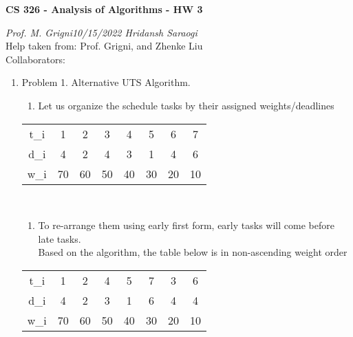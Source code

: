 \documentclass[11pt]{article}
\begin{document}
\begin{center}
    \textbf{CS 326 - Analysis of Algorithms - HW 3}\\
\end{center}


\begin{flushleft}
    \textit{Prof. M. Grigni\hfill10/15/2022 \hfill Hridansh Saraogi} \\
    \vspace{0.15cm}
    \small {Help taken from: Prof. Grigni, and Zhenke Liu}\\
    \small {Collaborators: }
\end{flushleft}


\begin{enumerate}

\item Problem 1. Alternative UTS Algorithm. 
    \begin{enumerate}
        \item Let us organize the schedule tasks by their assigned weights/deadlines
    \end{enumerate}
\begin{center}
    \begin{tabular}{ |c|c|c|c|c|c|c|c| } 
    \hline
    t_i & 1 & 2 & 3 & 4 & 5 & 6 & 7 \\ 
    d_i & 4 & 2 & 4 & 3 & 1 & 4 & 6 \\ 
    w_i & 70 & 60 & 50 & 40 & 30 & 20 & 10 \\ 
    \hline
    \end{tabular}\\
    
    \begin{enumerate}
        \item To re-arrange them using early first form, early tasks will come before late tasks.\\
        Based on the algorithm, the table below is in non-ascending weight order 
        
    \end{enumerate}
    
    \begin{tabular}{ |c|c|c|c|c|c|c|c| } 
    \hline
    t_i & 1 & 2 & 4 & 5 & 7 & 3 & 6 \\ 
    d_i & 4 & 2 & 3 & 1 & 6 & 4 & 4 \\ 
    w_i & 70 & 60 & 50 & 40 & 30 & 20 & 10 \\ 
    \hline
    \end{tabular}\\


\end{center}
\end{enumerate}
\end{document}
